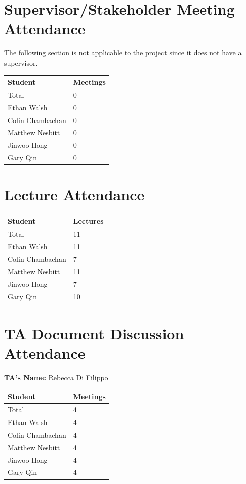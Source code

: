 \documentclass{article}
\begin{document}
\section{Supervisor/Stakeholder Meeting Attendance}

The following section is not applicable to the \progname{} project since it does not have a supervisor.

\begin{table}[H]
\centering
\begin{tabular}{ll}
\toprule
\textbf{Student} & \textbf{Meetings}\\
\midrule
Total & 0\\
Ethan Walsh & 0\\
Colin Chambachan & 0\\
Matthew Nesbitt & 0\\
Jinwoo Hong & 0\\
Gary Qin & 0\\
\bottomrule
\end{tabular}
\end{table}

\section{Lecture Attendance}

\begin{table}[H]
\centering
\begin{tabular}{ll}
\toprule
\textbf{Student} & \textbf{Lectures}\\
\midrule
Total & 11\\
Ethan Walsh & 11\\
Colin Chambachan & 7\\
Matthew Nesbitt & 11\\
Jinwoo Hong & 7\\
Gary Qin & 10\\
\bottomrule
\end{tabular}
\end{table}

\section{TA Document Discussion Attendance}

\noindent \textbf{TA's Name: } Rebecca Di Filippo

\begin{table}[H]
\centering
\begin{tabular}{ll}
\toprule
\textbf{Student} & \textbf{Meetings}\\
\midrule
Total & 4\\
Ethan Walsh & 4\\
Colin Chambachan & 4\\
Matthew Nesbitt & 4\\
Jinwoo Hong & 4\\
Gary Qin & 4\\
\bottomrule
\end{tabular}
\end{table}
\end{document}
